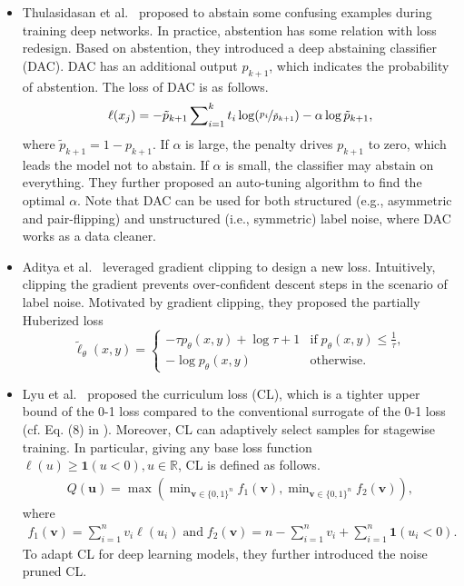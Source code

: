 \begin{itemize}[leftmargin=*]
which incentivizes to learn a prediction function inside of the symmetric interval. 
Mathematically, a barrier hinge loss is defined as follows.
\begin{equation}
\ell(z) = \max(-b(r+z)+r,\max(b(z-r),r-z)),
\end{equation}
where $b > 1$ and $r > 0$.
\item
Thulasidasan et al.~ proposed to abstain some confusing examples during training deep networks. 
In practice, abstention has some relation with loss redesign. Based on abstention, they introduced a deep abstaining classifier (DAC). 
DAC has an additional output $p_{k+1}$, which indicates the probability of abstention.
The loss of DAC is as follows.
\begin{equation}
\ell(x_j) 
= - \tilde{p}_{k + 1} \sum\nolimits_{i=1}^k t_i\log( \nicefrac{p_i}{\tilde{p}_{k + 1}} )
- \alpha\log \tilde{p}_{k + 1},  
\end{equation}
where $\tilde{p}_{k + 1} = 1-p_{k+1}$. If $\alpha$ is large, the penalty drives $p_{k+1}$ to zero, which leads the model not to abstain. If $\alpha$ is small, the classifier may abstain on everything. They further proposed an auto-tuning algorithm to find the optimal $\alpha$. Note that DAC can be used for both structured (e.g., asymmetric and pair-flipping) and unstructured (i.e., symmetric) label noise, where DAC works as a data cleaner.
\item
Aditya et al.~ leveraged gradient clipping to design a new loss. 
Intuitively, clipping the gradient prevents over-confident descent steps in the scenario of label noise. Motivated by gradient clipping, they proposed the partially Huberized loss
\begin{equation}
\tilde{\ell}_{\theta}(x,y)
\! = \!
\begin{cases}
-\tau p_{\theta}(x,y)
\! + \! \log\tau \! + \! 1 & \text{if} \; p_{\theta}(x,y) \leq \frac{1}{\tau}, 
\\
-\log p_{\theta}(x,y) & \text{otherwise}.
\end{cases}
\end{equation}
\item
Lyu et al.~ proposed the curriculum loss (CL), which is a tighter 
upper bound of the 0-1 loss compared to the conventional surrogate of the 0-1 loss (cf. Eq. (8) in ). Moreover, CL can adaptively select samples for stagewise training. In particular, giving any base loss function $\ell(u) \geq \mathbf{1} (u < 0), u \in \mathbb{R}$, CL is defined as follows.
\begin{align*}
Q(\mathbf{u}) 
=
\max
\left( 
\min\nolimits_{\mathbf{v}\in\{0,1\}^n} f_1(\mathbf{v})
,
\min\nolimits_{\mathbf{v}\in\{0,1\}^n} f_2(\mathbf{v})
\right),
\end{align*}
where
\begin{align*}
f_1(\mathbf{v}) 
\! = \! \sum_{i=1}^n v_i\ell(u_i)
\;\text{and}\;
f_2(\mathbf{v})
\! = \! n \! - \! \sum_{i=1}^n v_i \! + \! \sum_{i=1}^n \mathbf{1}(u_i \! < \! 0).
\end{align*}
To adapt CL for deep learning models, they further introduced the noise pruned CL.
\end{itemize}


